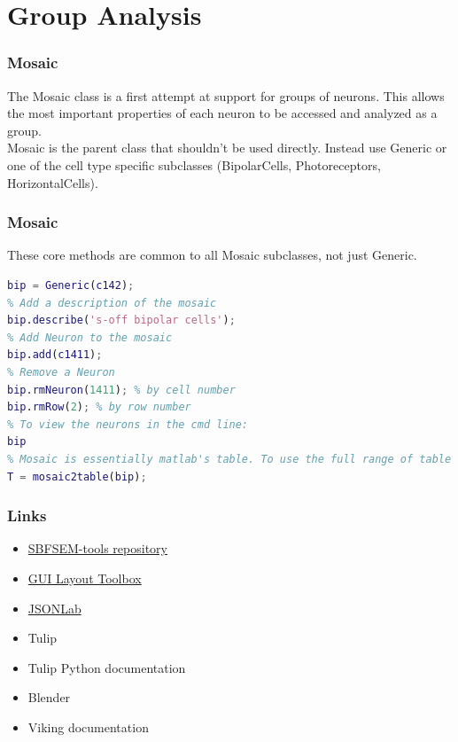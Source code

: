 \documentclass[11pt]{beamer}
\begin{document}
\section{Group Analysis}
\begin{frame}[fragile]
	\frametitle{Mosaic}
	The Mosaic class is a first attempt at support for groups of neurons. This allows the most important properties of each neuron to be accessed and analyzed as a group.\\
	\vskip10pt
	Mosaic is the parent class that shouldn't be used directly. Instead use Generic or one of the cell type specific subclasses (BipolarCells, Photoreceptors, HorizontalCells). 
\end{frame}
\begin{frame}[fragile]
	\frametitle{Mosaic}
	These core methods are common to all Mosaic subclasses, not just Generic.
	\begin{lstlisting}[language=matlab]
% Create a Mosaic by passing a Neuron
bip = Generic(c142);
% Add a description of the mosaic
bip.describe('s-off bipolar cells');
% Add Neuron to the mosaic
bip.add(c1411);
% Remove a Neuron
bip.rmNeuron(1411); % by cell number
bip.rmRow(2); % by row number
% To view the neurons in the cmd line:
bip
% Mosaic is essentially matlab's table. To use the full range of table methods, cast to table:
T = mosaic2table(bip);
\end{lstlisting} 
\end{frame}
\begin{frame}
	\frametitle{Links}
	\begin{itemize}
		\item \href{www.github.com/sarastokes/sbfsem-tools}{SBFSEM-tools repository}
		\item \href{https://www.mathworks.com/matlabcentral/fileexchange/47982-gui-layout-toolbox}{GUI Layout Toolbox}
		\item \href{https://www.mathworks.com/matlabcentral/fileexchange/33381-jsonlab--a-toolbox-to-encode-decode-json-files}{JSONLab}
		\item Tulip
		\item Tulip Python documentation
		\item Blender
		\item Viking documentation
	\end{itemize}
\end{frame}	
\end{document}

